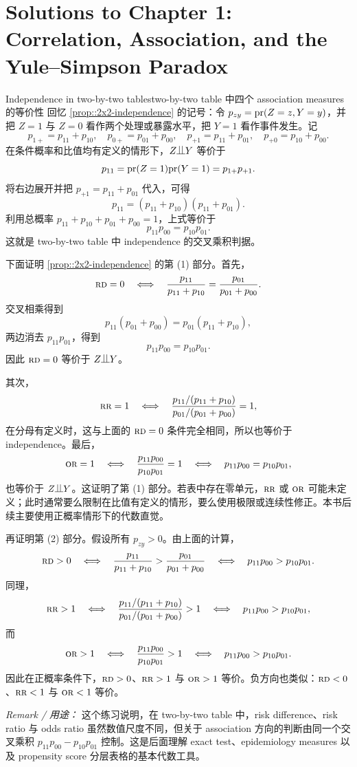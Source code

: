 \chapter{Solutions to Chapter 1: Correlation, Association, and the Yule--Simpson Paradox}
\label{sol:chapter01}

\begin{exercisesolution}{Independence in two-by-two tables}{two-by-two table 中四个 association measures 的等价性}
回忆 \cref{prop::2x2-independence} 的记号：令 $p_{zy}=\textup{pr}(Z=z,Y=y)$，并把 $Z=1$ 与 $Z=0$ 看作两个处理或暴露水平，把 $Y=1$ 看作事件发生。记
\[
p_{1+}=p_{11}+p_{10},\quad
p_{0+}=p_{01}+p_{00},\quad
p_{+1}=p_{11}+p_{01},\quad
p_{+0}=p_{10}+p_{00}.
\]
在条件概率和比值均有定义的情形下，$Z\ind Y$ 等价于
\[
p_{11}=\textup{pr}(Z=1)\textup{pr}(Y=1)=p_{1+}p_{+1}.
\]
将右边展开并把 $p_{+1}=p_{11}+p_{01}$ 代入，可得
\[
p_{11}= (p_{11}+p_{10})(p_{11}+p_{01}).
\]
利用总概率 $p_{11}+p_{10}+p_{01}+p_{00}=1$，上式等价于
\[
p_{11}p_{00}=p_{10}p_{01}.
\]
这就是 two-by-two table 中 independence 的交叉乘积判据。

下面证明 \cref{prop::2x2-independence} 的第 (1) 部分。首先，
\[
\textsc{rd}=0
\quad\Longleftrightarrow\quad
\frac{p_{11}}{p_{11}+p_{10}}
=
\frac{p_{01}}{p_{01}+p_{00}} .
\]
交叉相乘得到
\[
p_{11}(p_{01}+p_{00})=p_{01}(p_{11}+p_{10}),
\]
两边消去 $p_{11}p_{01}$，得到
\[
p_{11}p_{00}=p_{10}p_{01}.
\]
因此 $\textsc{rd}=0$ 等价于 $Z\ind Y$。

其次，
\[
\textsc{rr}=1
\quad\Longleftrightarrow\quad
\frac{p_{11}/(p_{11}+p_{10})}{p_{01}/(p_{01}+p_{00})}=1,
\]
在分母有定义时，这与上面的 $\textsc{rd}=0$ 条件完全相同，所以也等价于 independence。最后，
\[
\textsc{or}=1
\quad\Longleftrightarrow\quad
\frac{p_{11}p_{00}}{p_{10}p_{01}}=1
\quad\Longleftrightarrow\quad
p_{11}p_{00}=p_{10}p_{01},
\]
也等价于 $Z\ind Y$。这证明了第 (1) 部分。若表中存在零单元，$\textsc{rr}$ 或 $\textsc{or}$ 可能未定义；此时通常要么限制在比值有定义的情形，要么使用极限或连续性修正。本书后续主要使用正概率情形下的代数直觉。

再证明第 (2) 部分。假设所有 $p_{zy}>0$。由上面的计算，
\[
\textsc{rd}>0
\quad\Longleftrightarrow\quad
\frac{p_{11}}{p_{11}+p_{10}}
>
\frac{p_{01}}{p_{01}+p_{00}}
\quad\Longleftrightarrow\quad
p_{11}p_{00}>p_{10}p_{01}.
\]
同理，
\[
\textsc{rr}>1
\quad\Longleftrightarrow\quad
\frac{p_{11}/(p_{11}+p_{10})}{p_{01}/(p_{01}+p_{00})}>1
\quad\Longleftrightarrow\quad
p_{11}p_{00}>p_{10}p_{01},
\]
而
\[
\textsc{or}>1
\quad\Longleftrightarrow\quad
\frac{p_{11}p_{00}}{p_{10}p_{01}}>1
\quad\Longleftrightarrow\quad
p_{11}p_{00}>p_{10}p_{01}.
\]
因此在正概率条件下，$\textsc{rd}>0$、$\textsc{rr}>1$ 与 $\textsc{or}>1$ 等价。负方向也类似：$\textsc{rd}<0$、$\textsc{rr}<1$ 与 $\textsc{or}<1$ 等价。

\emph{Remark / 用途：} 这个练习说明，在 two-by-two table 中，risk difference、risk ratio 与 odds ratio 虽然数值尺度不同，但关于 association 方向的判断由同一个交叉乘积 $p_{11}p_{00}-p_{10}p_{01}$ 控制。这是后面理解 exact test、epidemiology measures 以及 propensity score 分层表格的基本代数工具。
\end{exercisesolution}

